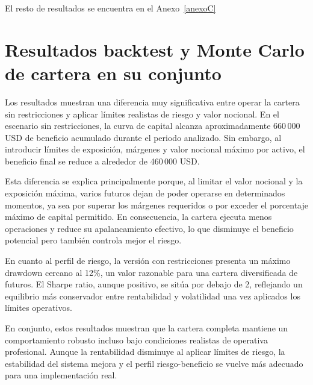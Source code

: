 El resto de resultados se encuentra en el Anexo~\ref{anexoC}

\section{Resultados backtest y Monte Carlo de cartera en su conjunto}

Los resultados muestran una diferencia muy significativa entre operar la cartera sin restricciones y aplicar límites realistas de riesgo y valor
nocional. En el escenario sin restricciones, la curva de capital alcanza aproximadamente 660\,000 USD de beneficio acumulado durante el periodo
analizado. Sin embargo, al introducir límites de exposición, márgenes y valor nocional máximo por activo, el beneficio final se reduce a alrededor de
460\,000 USD.

Esta diferencia se explica principalmente porque, al limitar el valor nocional y la exposición máxima, varios futuros dejan de poder operarse en
determinados momentos, ya sea por superar los márgenes requeridos o por exceder el porcentaje máximo de capital permitido. En consecuencia, la cartera
ejecuta menos operaciones y reduce su apalancamiento efectivo, lo que disminuye el beneficio potencial pero también controla mejor el riesgo.

En cuanto al perfil de riesgo, la versión con restricciones presenta un máximo drawdown cercano al 12\%, un valor razonable para una cartera
diversificada de futuros. El Sharpe ratio, aunque positivo, se sitúa por debajo de 2, reflejando un equilibrio más conservador entre rentabilidad y
volatilidad una vez aplicados los límites operativos.

En conjunto, estos resultados muestran que la cartera completa mantiene un comportamiento robusto incluso bajo condiciones realistas de operativa
profesional. Aunque la rentabilidad disminuye al aplicar límites de riesgo, la estabilidad del sistema mejora y el perfil riesgo-beneficio se vuelve
más adecuado para una implementación real.

